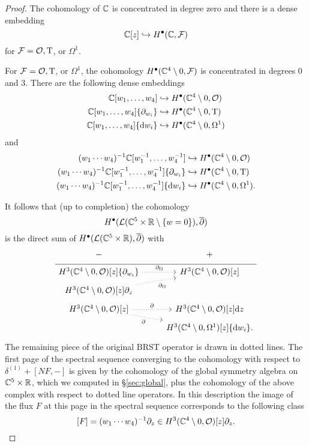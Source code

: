 \begin{proof}
The cohomology of $\mathbb C$ is concentrated in degree zero and there is a dense embedding
\[
\mathbb C[z] \hookrightarrow H^\bullet(\mathbb C, \mathcal F) 
\]
for $\mathcal F = \mathcal O, {\rm T}$, or $\Omega^1$. 

For $\mathcal F = \mathcal O, {\rm T}$, or $\Omega^1$, the cohomology $H^\bullet(\mathbb C^4 \setminus 0, \mathcal F)$ is concentrated in degrees $0$ and $3$. 
There are the following dense embeddings 
\begin{align*}
\mathbb C[w_1,\ldots, w_4] & \hookrightarrow H^\bullet(\mathbb C^4 \setminus 0, \mathcal O) \\ 
\mathbb C[w_1,\ldots, w_4] \{\partial_{w_i}\} & \hookrightarrow H^\bullet(\mathbb C^4 \setminus 0, {\rm T}) \\
\mathbb C[w_1,\ldots, w_4] \{{\rm d} w_i\} & \hookrightarrow H^\bullet(\mathbb C^4 \setminus 0, \Omega^1) 
\end{align*}
and
\begin{align*}
(w_1\cdots w_4)^{-1} \mathbb C[w_1^{-1},\ldots, w_4^{-1}] & \hookrightarrow H^\bullet(\mathbb C^4 \setminus 0, \mathcal O) \\ 
(w_1\cdots w_4)^{-1} \mathbb C[w_1^{-1},\ldots, w_4^{-1}] \{\partial_{w_i}\} & \hookrightarrow H^\bullet(\mathbb C^4 \setminus 0, {\rm T}) \\
(w_1\cdots w_4)^{-1} \mathbb C[w_1^{-1},\ldots, w_4^{-1}] \{{\rm d} w_i\} & \hookrightarrow H^\bullet(\mathbb C^4 \setminus 0, \Omega^1) .
\end{align*}

It follows that (up to completion) the cohomology 
\[
H^\bullet(\mathcal L(\mathbb C^5 \times \mathbb R \setminus \{w=0\}) , \overline{\partial})
\]
is the direct sum of $H^\bullet(\mathcal L(\mathbb C^5 \times \mathbb R), \overline{\partial})$ with 
\begin{equation}
  \label{eqn:ads4ss2} 
  \begin{tikzcd}[row sep = 1 ex]
    - & + \\ \hline
H^3(\CC^4\setminus 0, \cO)[z] \{\partial_{w_i}\}  \ar[r, dotted, "\div"] & H^3(\CC^4 \setminus 0, \cO) [z] \\
H^3(\CC^4\setminus 0, \cO) [z] \partial_z \ar[ur, dotted, "\div"'] \\
H^3(\CC^4\setminus 0, \cO) [z] \ar[r, dotted, "\del"] \ar[dr, dotted, "\del"'] & H^3(\CC^4\setminus 0, \cO)[z] \d z \\ & H^3(\CC^4\setminus 0, \Omega^1)[z] \{\d w_i\} .
\end{tikzcd}
\end{equation}
The remaining piece of the original BRST operator is drawn in dotted lines. 
The first page of the spectral sequence converging to the cohomology with respect to $\delta^{(1)} + [N F, -]$ is given by the cohomology of the global symmetry algebra on $\mathbb C^5 \times \mathbb R$, which we computed in \S \ref{sec:global}, plus the cohomology of the above complex with respect to dotted line operators. 
In this description the image of the flux $F$ at this page in the spectral sequence corresponds to the following class 
\[
[F] = (w_1 \cdots w_4)^{-1} \partial_z \in H^3(\mathbb C^4\setminus 0, \mathcal O) [z] \partial_z .
\]


\end{proof}
